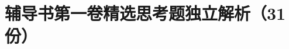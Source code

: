 \documentclass[UTF8,a4paper,11pt]{ctexart}
\begin{document}
\part*{辅导书第一卷精选思考题独立解析（31份）}











\end{document}
